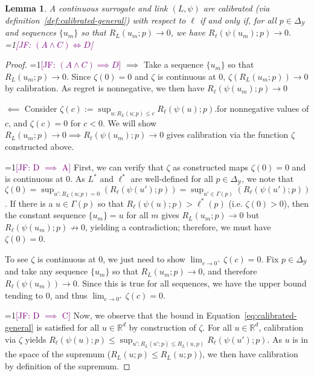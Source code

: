 \documentclass{article}
\newcommand{\Comments}{1}
\newcommand{\mynote}[2]{\ifnum\Comments=1\textcolor{#1}{#2}\fi}
\newcommand{\jessie}[1]{\mynote{purple}{[JF: #1]}}
\newcommand{\reals}{\mathbb{R}}
\newcommand{\simplex}{\Delta_\Y}
\newcommand{\Y}{\mathcal{Y}}
\newcommand{\risk}[1]{#1^*}
\newtheorem{lemma}{Lemma}
\begin{document}
\begin{lemma}\label{lem:calib-converging-regrets}
	A continuous surrogate and link $(L,\psi)$ are calibrated (via definition~\ref{def:calibrated-general}) with respect to $\ell$ if and only if, for all $p \in \simplex$ and sequences $\{u_m\}$ so that $R_L(u_m; p) \to 0$, we have $R_\ell(\psi(u_m); p) \to 0$.
	\jessie{$(A \wedge C) \iff D$}
\end{lemma}
\begin{proof}
\jessie{$(A \wedge C) \implies D$}
	$\implies$ Take a sequence $\{u_m\}$ so that $R_L(u_m;p) \to 0$.
	Since $\zeta(0) = 0$ and $\zeta$ is continuous at $0$, $\zeta(R_L(u_m;p)) \to 0$ by calibration.
	As regret is nonnegative, we then have $R_\ell(\psi(u_m); p) \to 0$
	
	$\impliedby$ Consider $\zeta(c) := \sup_{u: R_L(u;p) \leq c} R_\ell(\psi(u); p)$.for nonnegative values of $c$, and $\zeta(c) = 0$ for $c < 0$.
	We will show $R_L(u_m; p) \to 0 \implies R_\ell(\psi(u_m); p) \to 0$ gives calibration via the function $\zeta$ constructed above. 
	
\jessie{D $\implies$ A}
	First, we can verify that $\zeta$ as constructed maps $\zeta(0) = 0$ and is continuous at $0$.	
	As $\risk{L}$ and $\risk{\ell}$ are well-defined for all $p \in \simplex$, we note that $\zeta(0) = \sup_{u':R_L(u;p) = 0} (R_\ell(\psi(u'); p)) = \sup_{u' \in \Gamma(p)} (R_\ell(\psi(u'); p))$.
	If there is a $u \in \Gamma(p)$ so that $R_\ell(\psi(u); p) > \risk{\ell}(p)$ (i.e. $\zeta(0) > 0$), then the constant sequence $\{u_m\} = u$ for all $m$ gives $R_L(u_m;p) \to 0$ but $R_\ell(\psi(u_m); p) \not \to 0$, yielding a contradiction; therefore, we must have $\zeta(0) = 0$.
	
	To see $\zeta$ is continuous at $0$, we just need to show $\lim_{c \to 0^+} \zeta(c) = 0$. 
	Fix $p \in \simplex$ and take any sequence $\{u_m\}$ so that $R_L(u_m; p) \to 0$, and therefore $R_\ell(\psi(u_m)) \to 0$.
	Since this is true for all sequences, we have the upper bound tending to $0$, and thus $\lim_{c\to 0^+}\zeta(c) = 0$.
		
\jessie{D $\implies$ C}
	Now, we observe that the bound in Equation~\eqref{eq:calibrated-general} is satisfied for all $u \in \reals^d$ by construction of $\zeta$.	
	For all $u \in \reals^d$, calibration via $\zeta$ yields $R_\ell(\psi(u);p) \leq \sup_{u' : R_L(u';p) \leq R_L(u,p)} R_\ell(\psi(u') ; p)$.
	As $u$ is in the space of the supremum ($R_L(u;p) \leq R_L(u;p)$), we then have calibration by definition of the supremum.
\end{proof}
\end{document}

